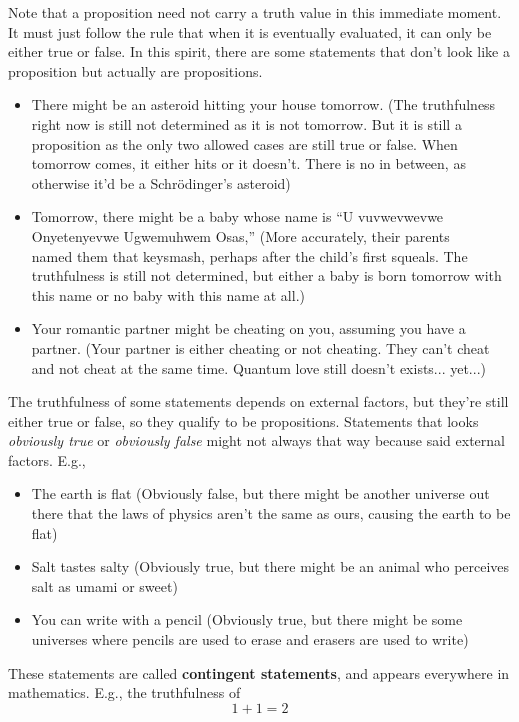Note that a proposition need not carry a truth value in this immediate moment. It must just follow the rule that when it is eventually evaluated, it can only be either true or false. In this spirit, there are some statements that don’t look like a proposition but actually are propositions.
\begin{itemize}
  \item There might be an asteroid hitting your house tomorrow. (The truthfulness right now is still not determined as it is not tomorrow. But it is still a proposition as the only two allowed cases are still true or false. When tomorrow comes, it either hits or it doesn't. There is no in between, as otherwise it’d be a Schr\"odinger’s asteroid)
  \item Tomorrow, there might be a baby whose name is ``U
        vuvwevwevwe On\-yetenyevwe Ugwemuhwem Osas,'' (More accurately, their parents \\named them that keysmash, perhaps after the child's first squeals. The truthfulness is still not determined, but either a baby is born tomorrow with this name or no baby with this name at all.)
  \item Your romantic partner might be cheating on you, assuming you have a partner. (Your partner is either cheating or not cheating. They can't cheat and not cheat at the same time. Quantum love still doesn't exists... yet...)
\end{itemize}
The truthfulness of some statements depends on external factors, but they're still either true or false, so they qualify to be propositions. Statements that looks \emph{obviously true} or \emph{obviously false} might not always that way because said external factors. E.g.,
\begin{itemize}
  \item The earth is flat (Obviously false, but there might be another universe out there that the laws of physics aren't the same as ours, causing the earth to be flat)
  \item Salt tastes salty (Obviously true, but there might be an animal who perceives salt as umami or sweet)
  \item You can write with a pencil (Obviously true, but there might be some universes where pencils are used to erase and erasers are used to write)
\end{itemize}
These statements are called \textbf{contingent statements}, and appears everywhere in mathematics. E.g., the truthfulness of
\begin{equation}
  1 + 1 = 2
\end{equation}

